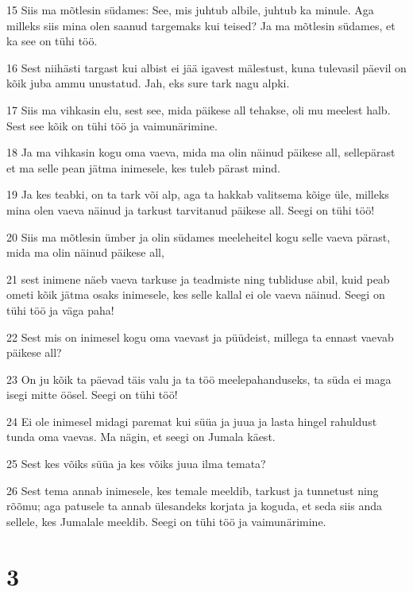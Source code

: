 \par 15 Siis ma mõtlesin südames: See, mis juhtub albile, juhtub ka minule. Aga milleks siis mina olen saanud targemaks kui teised? Ja ma mõtlesin südames, et ka see on tühi töö.
\par 16 Sest niihästi targast kui albist ei jää igavest mälestust, kuna tulevasil päevil on kõik juba ammu unustatud. Jah, eks sure tark nagu alpki.
\par 17 Siis ma vihkasin elu, sest see, mida päikese all tehakse, oli mu meelest halb. Sest see kõik on tühi töö ja vaimunärimine.
\par 18 Ja ma vihkasin kogu oma vaeva, mida ma olin näinud päikese all, sellepärast et ma selle pean jätma inimesele, kes tuleb pärast mind.
\par 19 Ja kes teabki, on ta tark või alp, aga ta hakkab valitsema kõige üle, milleks mina olen vaeva näinud ja tarkust tarvitanud päikese all. Seegi on tühi töö!
\par 20 Siis ma mõtlesin ümber ja olin südames meeleheitel kogu selle vaeva pärast, mida ma olin näinud päikese all,
\par 21 sest inimene näeb vaeva tarkuse ja teadmiste ning tubliduse abil, kuid peab ometi kõik jätma osaks inimesele, kes selle kallal ei ole vaeva näinud. Seegi on tühi töö ja väga paha!
\par 22 Sest mis on inimesel kogu oma vaevast ja püüdeist, millega ta ennast vaevab päikese all?
\par 23 On ju kõik ta päevad täis valu ja ta töö meelepahanduseks, ta süda ei maga isegi mitte öösel. Seegi on tühi töö!
\par 24 Ei ole inimesel midagi paremat kui süüa ja juua ja lasta hingel rahuldust tunda oma vaevas. Ma nägin, et seegi on Jumala käest.
\par 25 Sest kes võiks süüa ja kes võiks juua ilma temata?
\par 26 Sest tema annab inimesele, kes temale meeldib, tarkust ja tunnetust ning rõõmu; aga patusele ta annab ülesandeks korjata ja koguda, et seda siis anda sellele, kes Jumalale meeldib. Seegi on tühi töö ja vaimunärimine.

\chapter{3}

